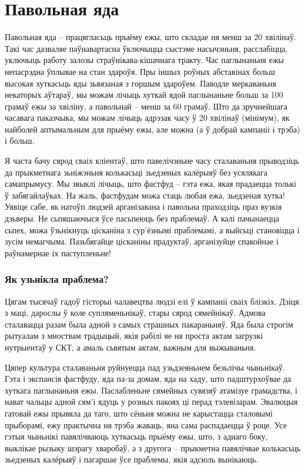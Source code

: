 \chapter{Павольная яда}

Павольная яда – працягласьць прыёму ежы, што складае ня менш за 20 хвілінаў. Такі час дазваляе паўнавартасна ўключыцца сыстэме насычэньня, расслабіцца, уключыць работу залозы страўнікава-кішачнага тракту. Час паглынаньня ежы непасрэдна ўплывае на стан здароўя. Пры іншых роўных абставінах больш высокая хуткасьць яды зьвязаная з горшым здароўем. Паводле меркаваньня некаторых аўтараў, мы можам лічыць хуткай ядой паглынаньне больш за 100 грамаў ежы за хвіліну, а павольнай – менш за 60 грамаў. Што да зручнейшага часавага паказчыка, мы можам лічыць адрэзак часу ў 20 хвілінаў (мінімум), як найболей аптымальным для прыёму ежы, але можна (а ў добрай кампаніі і трэба) і больш.

Я часта бачу сярод сваіх кліентаў, што павелічэньне часу сталаваньня прыводзіць да прыкметнага зьніжэньня колькасьці зьедзеных калёрыяў без усялякага самапрымусу. Мы звыклі лічыць, што фастфуд – гэта ежа, якая прадаецца толькі ў забягайлаўках. На жаль, фастфудам можа стаць любая ежа, зьедзеная хутка! Уявіце сабе, як натоўп людзей арганізавана і павольна праходзіць праз вузкія дзьверы. Не сьпяшаючыся ўсе пасьпеюць без праблемаў. А калі пачынаецца сьпех, можа ўзьнікнуць цісканіна з сур'ёзнымі праблемамі, а выйсьці становіцца і зусім немагчыма. Пазьбягайце цісканіны прадуктаў, арганізуйце спакойнае і раўнамернае іх паступленьне!

\subsection{Як узьнікла праблема?}

Цягам тысячаў гадоў гісторыі чалавецтва людзі елі ў кампаніі сваіх блізкіх. Дзіця з маці, дарослы ў коле супляменьнікаў, стары сярод сямейнікаў. Адмова сталавацца разам была адной з самых страшных пакараньняў. Яда была строгім рытуалам з мноствам традыцый, якія рабілі яе ня проста актам загрузкі нутрыентаў у СКТ, а амаль сьвятым актам, важным для выжываньня.

Цяпер культура сталаваньня руйнуецца пад узьдзеяньнем безьлічы чыньнікаў. Гэта і экспансія фастфуду, яда па-за домам, яда на хаду, што падштурхоўвае да хуткага паглынаньня ежы. Паслабленьне сямейных сувязяў атамізуе грамадства, і нават чальцы адной сям'і ядуць у розных пакоях ці перад тэлевізарам. Эвалюцыя гатовай ежы прывяла да таго, што сёньня можна не карыстацца сталовымі прыборамі, ежу практычна ня трэба жаваць, яна сама распадаецца ў роце. Усе гэтыя чыньнікі павялічваюць хуткасьць прыёму ежы, што, з аднаго боку, выклікае рызыку шэрагу хваробаў, а з другога – прыкметна павялічвае колькасьць зьедзеных калёрыяў і пагаршае ўсе праблемы, якія адсюль вынікаюць.


